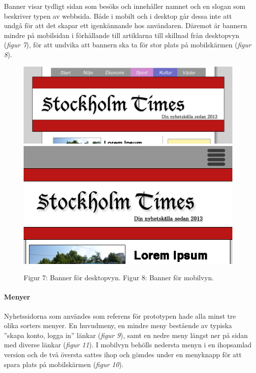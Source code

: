 \documentclass[11pt]{article}
\begin{document}
Banner visar tydligt sidan som besöks och innehåller namnet och en slogan som beskriver typen av webbsida. Både i mobilt och i desktop går dessa inte att undgå för att det skapar ett igenkännande hos användaren. Däremot är bannern mindre på mobilsidan i förhållande till artiklarna till skillnad från desktopvyn (\textit{figur 7}), för att undvika att bannern ska ta för stor plats på mobilskärmen (\textit{figur 8}).
\\
\begin{figure}[H]
\centerline{%
\includegraphics[scale=0.258]{pics/bannerdesktop.png}\hspace{2em}%
\includegraphics[scale=0.40]{pics/bannermobil.png}%
}
\vspace{0.3cm}
\hspace{0.15cm}Figur 7: Banner för desktopvyn.\hspace{4.4cm} Figur 8: Banner för mobilvyn.

\end{figure}

\paragraph{Menyer}\mbox{}

Nyhetssidorna som användes som referens för prototypen hade alla minst tre olika sorters menyer. En huvudmeny, en mindre meny bestående av typiska ”skapa konto, logga in” länkar (\textit{figur 9}), samt en nedre meny längst ner på sidan med diverse länkar (\textit{figur 11}). I mobilvyn behölls nedersta menyn i en ihopsamlad version och de två översta sattes ihop och gömdes under en menyknapp för att spara plats på mobilskärmen (\textit{figur 10}).
\\
\end{document}
